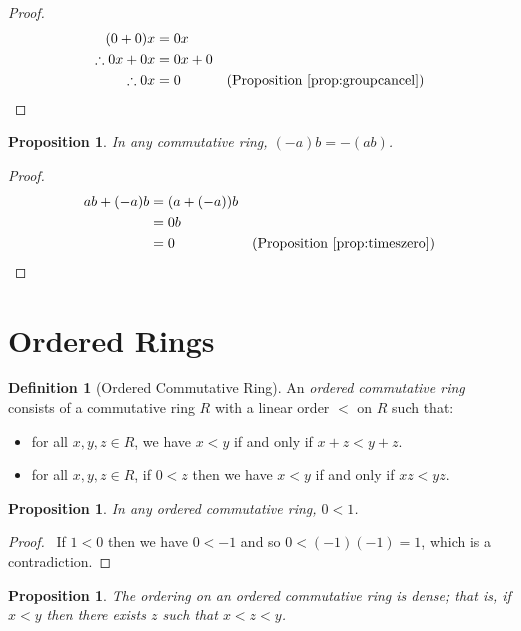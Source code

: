 \documentclass{book}
\let\qed\relax
\newtheorem{prop}[ax]{Proposition}
\theoremstyle{definition}
\newtheorem{df}[ax]{Definition}
\begin{document}
\begin{proof}
\pf
\begin{align*}
(0+0)x & = 0x \\
\therefore 0x + 0x & = 0x + 0 \\
\therefore 0x & = 0 & (\text{Proposition \ref{prop:groupcancel}}) \qed
\end{align*}
\end{proof}

\begin{prop}
In any commutative ring, $(-a)b = -(ab)$.
\end{prop}

\begin{proof}
\pf
\begin{align*}
ab + (-a)b & = (a + (-a))b \\
& = 0b \\
& = 0 & (\text{Proposition \ref{prop:timeszero}}) \qed
\end{align*}
\end{proof}

\section{Ordered Rings}

\begin{df}[Ordered Commutative Ring]
An \emph{ordered commutative ring} consists of a commutative ring $R$ with a linear order $<$ on $R$ such that:
\begin{itemize}
\item for all $x,y,z \in R$, we have $x < y$ if and only if $x + z < y + z$.
\item for all $x,y,z \in R$, if $0 < z$ then we have $x < y$ if and only if $xz < yz$.
\end{itemize}
\end{df}

\begin{prop}
In any ordered commutative ring, $0 < 1$.
\end{prop}

\begin{proof}
\pf\ If $1 < 0$ then we have $0 < -1$ and so $0 < (-1)(-1) = 1$, which is a contradiction. \qed
\end{proof}

\begin{prop}
The ordering on an ordered commutative ring is dense; that is, if $x < y$ then there exists $z$ such that $x < z < y$.
\end{prop}
\end{document}
